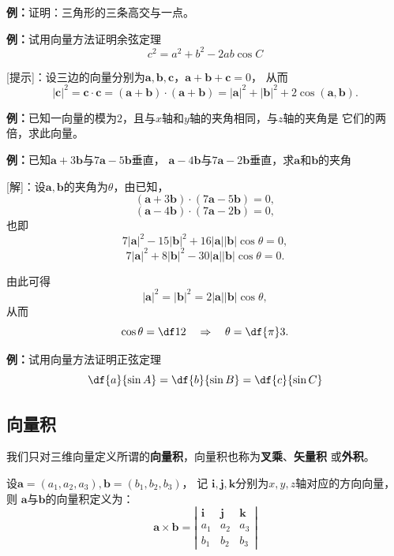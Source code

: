 {\bf 例：}证明：三角形的三条高交与一点。

{\bf 例：}试用向量方法证明余弦定理
$$c^2=a^2+b^2-2ab\cos C$$

[提示]：设三边的向量分别为$\bm{a},\bm{b},\bm{c}$，$\bm{a}+\bm{b}+\bm{c}=0$，
从而
$$|\bm{c}|^2=\bm{c}\cdot\bm{c}=(\bm{a}+\bm{b})\cdot(\bm{a}+\bm{b})
=|\bm{a}|^2+|\bm{b}|^2+2\cos(\bm{a},\bm{b}).$$

{\bf 例：}已知一向量的模为$2$，且与$x$轴和$y$轴的夹角相同，与$z$轴的夹角是
它们的两倍，求此向量。

{\bf 例：}已知$\bm{a}+3\bm{b}$与$7\bm{a}-5\bm{b}$垂直，
$\bm{a}-4\bm{b}$与$7\bm{a}-2\bm{b}$垂直，求$\bm{a}$和$\bm{b}$的夹角


[解]：设$\bm{a},\bm{b}$的夹角为$\theta$，由已知，
$$(\bm{a}+3\bm{b})\cdot(7\bm{a}-5\bm{b})=0,$$
$$(\bm{a}-4\bm{b})\cdot(7\bm{a}-2\bm{b})=0,$$
也即
$$7|\bm{a}|^2-15|\bm{b}|^2+16|\bm{a}||\bm{b}|\cos\theta=0,$$
$$7|\bm{a}|^2+8|\bm{b}|^2-30|\bm{a}||\bm{b}|\cos\theta=0.$$

由此可得
$$|\bm{a}|^2=|\bm{b}|^2=2|\bm{a}||\bm{b}|\cos\theta,$$
从而
$$\cos\theta=\df12\quad\Rightarrow\quad\theta=\df{\pi}3.$$
\fin

{\bf 例：}试用向量方法证明正弦定理
$$\df{a}{\sin A}=\df{b}{\sin B}=\df{c}{\sin C}$$

\subsection{向量积}

我们只对三维向量定义所谓的{\bf 向量积}，向量积也称为{\bf 叉乘}、{\bf 矢量积}
或{\bf 外积}。

设$\bm{a}=(a_1,a_2,a_3),\bm{b}=(b_1,b_2,b_3)$， 记
$\bm{i},\bm{j},\bm{k}$分别为$x,y,z$轴对应的方向向量， 则
$\bm{a}$与$\bm{b}$的向量积定义为：
$$\bm{a}\times\bm{b}=\left|\begin{array}{ccc}
\bm{i} & \bm{j} & \bm{k}\\
a_1 & a_2 & a_3\\
b_1 & b_2 & b_3
\end{array}\right|$$

